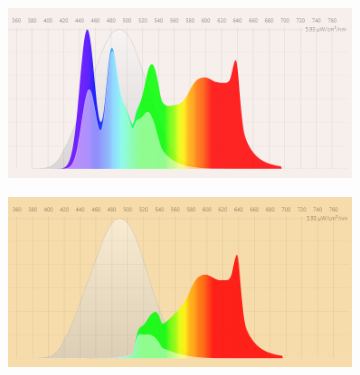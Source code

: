 \begin{figure}[bt]
\centering
\begin{subfigure}[h]{0.45\textwidth}
	\includegraphics[width=\textwidth]{Images/Spectra/MN.png}
\end{subfigure}
\begin{subfigure}[h]{0.45\textwidth}
	\includegraphics[width=\textwidth]{Images/Spectra/AN.png}
\end{subfigure}


\end{figure}
